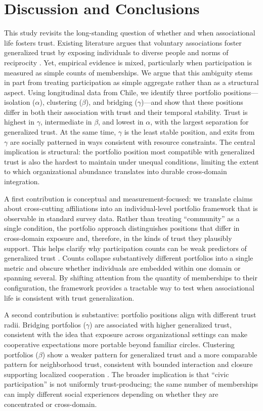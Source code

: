 \section{Discussion and Conclusions}

This study revisits the long-standing question of whether and when associational life fosters trust. Existing literature argues that voluntary associations foster generalized trust by exposing individuals to diverse people and norms of reciprocity \parencite{paxton_social_2002,paxton_trust_2018}. Yet, empirical evidence is mixed, particularly when participation is measured as simple counts of memberships. We argue that this ambiguity stems in part from treating participation as simple aggregate rather than as a structural aspect. Using longitudinal data from Chile, we identify three portfolio positions—isolation ($\alpha$), clustering ($\beta$), and bridging ($\gamma$)—and show that these positions differ in both their association with trust and their temporal stability. Trust is highest in $\gamma$, intermediate in $\beta$, and lowest in $\alpha$, with the largest separation for generalized trust. At the same time, $\gamma$ is the least stable position, and exits from $\gamma$ are socially patterned in ways consistent with resource constraints. The central implication is structural: the portfolio position most compatible with generalized trust is also the hardest to maintain under unequal conditions, limiting the extent to which organizational abundance translates into durable cross-domain integration.

A first contribution is conceptual and measurement-focused: we translate claims about cross-cutting affiliations into an individual-level portfolio framework that is observable in standard survey data. Rather than treating “community” as a single condition, the portfolio approach distinguishes positions that differ in cross-domain exposure and, therefore, in the kinds of trust they plausibly support. This helps clarify why participation counts can be weak predictors of generalized trust \parencite{paxton_association_2007}. Counts collapse substantively different portfolios into a single metric and obscure whether individuals are embedded within one domain or spanning several. By shifting attention from the quantity of memberships to their configuration, the framework provides a tractable way to test when associational life is consistent with trust generalization.

A second contribution is substantive: portfolio positions align with different trust radii. Bridging portfolios ($\gamma$) are associated with higher generalized trust, consistent with the idea that exposure across organizational settings can make cooperative expectations more portable beyond familiar circles. Clustering portfolios ($\beta$) show a weaker pattern for generalized trust and a more comparable pattern for neighborhood trust, consistent with bounded interaction and closure supporting localized cooperation \parencite{coleman_social_1988,portes_social_1998}. The broader implication is that “civic participation” is not uniformly trust-producing; the same number of memberships can imply different social experiences depending on whether they are concentrated or cross-domain.

